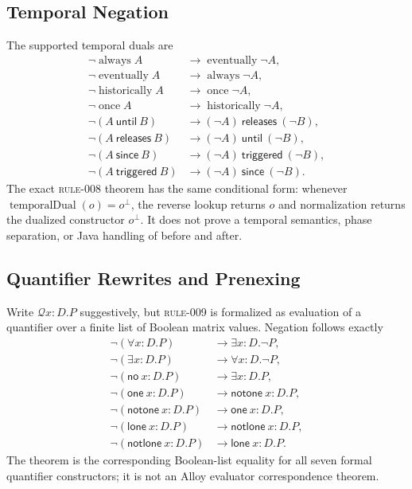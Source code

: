 \subsection{Temporal Negation}

The supported temporal duals are
\begin{align*}
 \neg\operatorname{always}A
   &\longrightarrow\operatorname{eventually}\neg A,\\
 \neg\operatorname{eventually}A
   &\longrightarrow\operatorname{always}\neg A,\\
 \neg\operatorname{historically}A
   &\longrightarrow\operatorname{once}\neg A,\\
 \neg\operatorname{once}A
   &\longrightarrow\operatorname{historically}\neg A,\\
 \neg(A\ \mathsf{until}\ B)
   &\longrightarrow(\neg A)\ \mathsf{releases}\ (\neg B),\\
 \neg(A\ \mathsf{releases}\ B)
   &\longrightarrow(\neg A)\ \mathsf{until}\ (\neg B),\\
 \neg(A\ \mathsf{since}\ B)
   &\longrightarrow(\neg A)\ \mathsf{triggered}\ (\neg B),\\
 \neg(A\ \mathsf{triggered}\ B)
   &\longrightarrow(\neg A)\ \mathsf{since}\ (\neg B).
\end{align*}
The exact \textsc{rule-008} theorem has the same conditional form: whenever
$\operatorname{temporalDual}(o)=o^\bot$, the reverse lookup returns $o$ and
normalization returns the dualized constructor $o^\bot$.  It does not prove a
temporal semantics, phase separation, or Java handling of \textsf{before} and
\textsf{after}.

\subsection{Quantifier Rewrites and Prenexing}

Write $\mathcal Qx{:}D.P$ suggestively, but \textsc{rule-009} is formalized as
evaluation of a quantifier over a finite list of Boolean matrix values.
Negation follows exactly
\begin{align*}
 \neg(\forall x{:}D.P)&\longrightarrow\exists x{:}D.\neg P,\\
 \neg(\exists x{:}D.P)&\longrightarrow\forall x{:}D.\neg P,\\
 \neg(\mathsf{no}\ x{:}D.P)&\longrightarrow\exists x{:}D.P,\\
 \neg(\mathsf{one}\ x{:}D.P)&\longrightarrow\mathsf{notone}\ x{:}D.P,\\
 \neg(\mathsf{notone}\ x{:}D.P)&\longrightarrow\mathsf{one}\ x{:}D.P,\\
 \neg(\mathsf{lone}\ x{:}D.P)&\longrightarrow\mathsf{notlone}\ x{:}D.P,\\
 \neg(\mathsf{notlone}\ x{:}D.P)&\longrightarrow\mathsf{lone}\ x{:}D.P.
\end{align*}
The theorem is the corresponding Boolean-list equality for all seven formal
quantifier constructors; it is not an Alloy evaluator correspondence theorem.

